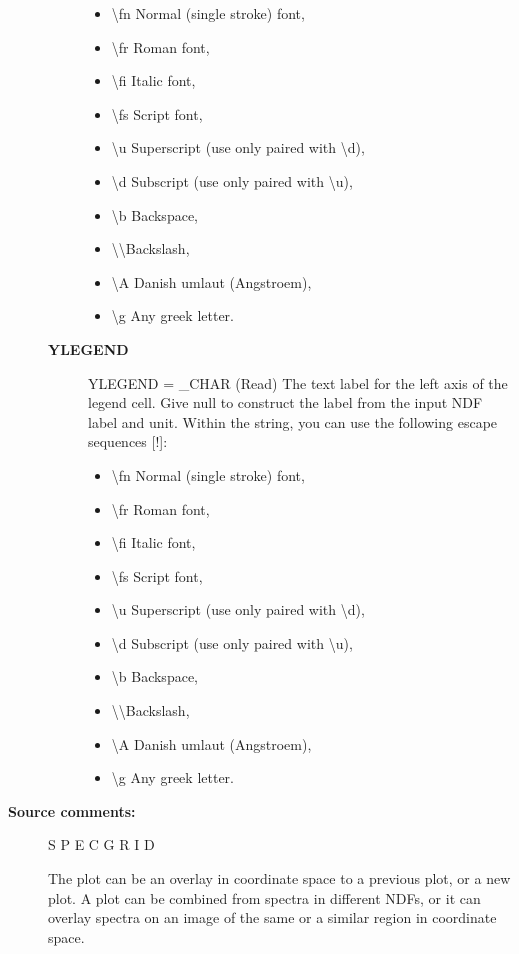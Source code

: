 \begin{description}
\begin{description}
\begin{itemize}
   \item \textbackslash fn Normal (single stroke) font,
   \item \textbackslash fr Roman font,
   \item \textbackslash fi Italic font,
   \item \textbackslash fs Script font,
   \item \textbackslash u  Superscript (use only paired with \textbackslash d),
   \item \textbackslash d  Subscript (use only paired with \textbackslash u),
   \item \textbackslash b  Backspace,
   \item \textbackslash \textbackslash   Backslash,
   \item \textbackslash A  Danish umlaut (Angstroem),
   \item \textbackslash g  Any greek letter.
   \end{itemize}
\item [\textbf{YLEGEND}]
YLEGEND = \_CHAR (Read)
   The text label for the left axis of the legend cell. Give null
   to construct the label from the input NDF label and
   unit. Within the string, you can use the following escape
   sequences [!]:
   \begin{itemize}
   \item \textbackslash fn Normal (single stroke) font,
   \item \textbackslash fr Roman font,
   \item \textbackslash fi Italic font,
   \item \textbackslash fs Script font,
   \item \textbackslash u  Superscript (use only paired with \textbackslash d),
   \item \textbackslash d  Subscript (use only paired with \textbackslash u),
   \item \textbackslash b  Backspace,
   \item \textbackslash \textbackslash   Backslash,
   \item \textbackslash A  Danish umlaut (Angstroem),
   \item \textbackslash g  Any greek letter.
   \end{itemize}
\end{description}

\item [\textbf{Source comments:}]
\begin{terminalv}
   S P E C G R I D

   The plot can be an overlay in coordinate space to a previous plot,
   or a new plot. A plot can be combined from spectra in different
   NDFs, or it can overlay spectra on an image of the same or a
   similar region in coordinate space.


\end{terminalv}
\end{description}
